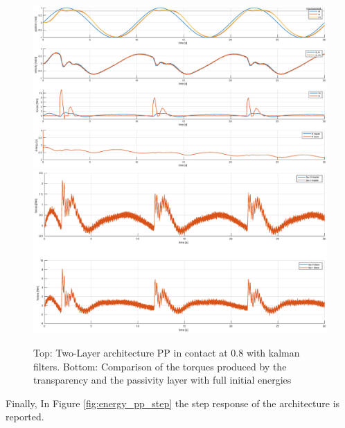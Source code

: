 \documentclass[a4paper,12pt]{article}
\begin{document}
\begin{figure}[H]
    \hspace*{-4.5cm}
    \includegraphics[scale=0.5]{images/energy_pp_kalman.eps}
    \qquad
    \hspace*{-1.5cm}
    \includegraphics[scale=0.4]{images/energy_pp_tau_kalman.eps}
    \caption{Top: Two-Layer architecture PP in contact at 0.8 with kalman filters. Bottom: Comparison of the torques produced by the transparency and the passivity layer with full initial energies}
    \label{fig:energy_pp_kalman}
\end{figure}
\newpage

Finally, In Figure \ref{fig:energy_pp_step} the step response of the architecture is reported.
\end{document}
